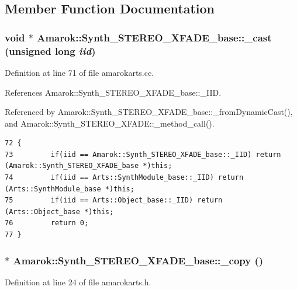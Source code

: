 \subsection{Member Function Documentation}
\subsubsection{\setlength{\rightskip}{0pt plus 5cm}void $\ast$ Amarok::Synth\_\-STEREO\_\-XFADE\_\-base::\_\-cast (unsigned long {\em iid})\hspace{0.3cm}{\tt  [inherited]}}\label{classAmarok_1_1Synth__STEREO__XFADE__base_Amarok_1_1Synth__STEREO__XFADE__stuba6}




Definition at line 71 of file amarokarts.cc.

References Amarok::Synth\_\-STEREO\_\-XFADE\_\-base::\_\-IID.

Referenced by Amarok::Synth\_\-STEREO\_\-XFADE\_\-base::\_\-from\-Dynamic\-Cast(), and Amarok::Synth\_\-STEREO\_\-XFADE::\_\-method\_\-call().



\footnotesize\begin{verbatim}72 {
73         if(iid == Amarok::Synth_STEREO_XFADE_base::_IID) return (Amarok::Synth_STEREO_XFADE_base *)this;
74         if(iid == Arts::SynthModule_base::_IID) return (Arts::SynthModule_base *)this;
75         if(iid == Arts::Object_base::_IID) return (Arts::Object_base *)this;
76         return 0;
77 }
\end{verbatim}\normalsize 
{}
\subsubsection{$\ast$ Amarok::Synth\_\-STEREO\_\-XFADE\_\-base::\_\-copy ()\hspace{0.3cm}{\tt  [inline, inherited]}}\label{classAmarok_1_1Synth__STEREO__XFADE__base_Amarok_1_1Synth__STEREO__XFADE__stuba3}




Definition at line 24 of file amarokarts.h.

